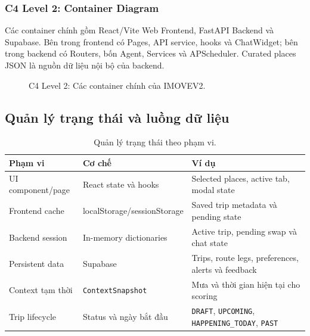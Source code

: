 \documentclass[12pt,a4paper]{article}
\begin{document}
\subsubsection{C4 Level 2: Container Diagram}

Các container chính gồm React/Vite Web Frontend, FastAPI Backend và Supabase. Bên trong frontend có Pages, API service, hooks và ChatWidget; bên trong backend có Routers, bốn Agent, Services và APScheduler. Curated places JSON là nguồn dữ liệu nội bộ của backend.

\begin{figure}[H]
\centering
{}
\caption{C4 Level 2: Các container chính của IMOVEV2.}
\label{fig:c4-container}
\end{figure}

\subsection{Quản lý trạng thái và luồng dữ liệu}


\begin{table}[H]
\centering
\begin{tabularx}{\textwidth}{|L{3.2cm}|L{4.0cm}|X|}
\hline
\textbf{Phạm vi} & \textbf{Cơ chế} & \textbf{Ví dụ} \\ \hline
UI component/page & React state và hooks & Selected places, active tab, modal state \\ \hline
Frontend cache & localStorage/sessionStorage & Saved trip metadata và pending state \\ \hline
Backend session & In-memory dictionaries & Active trip, pending swap và chat state \\ \hline
Persistent data & Supabase & Trips, route legs, preferences, alerts và feedback \\ \hline
Context tạm thời & \texttt{ContextSnapshot} & Mưa và thời gian hiện tại cho scoring \\ \hline
Trip lifecycle & Status và ngày bắt đầu & \texttt{DRAFT}, \texttt{UPCOMING}, \texttt{HAPPENING\_TODAY}, \texttt{PAST} \\ \hline
\end{tabularx}
\caption{Quản lý trạng thái theo phạm vi.}
\label{tab:state-management}
\end{table}
\end{document}
